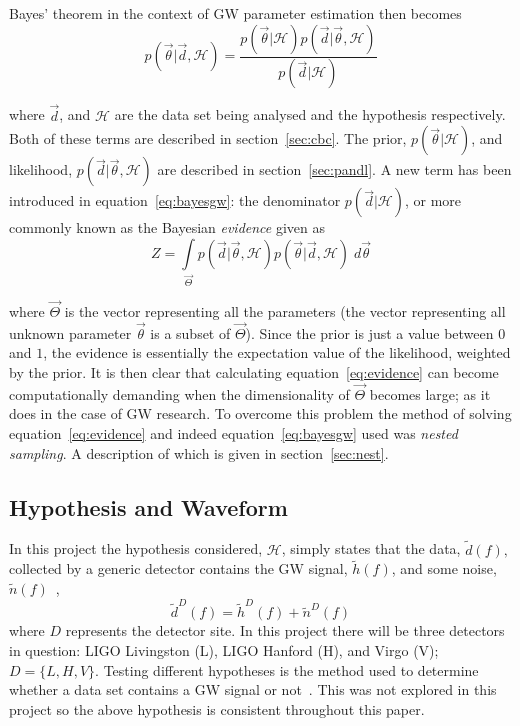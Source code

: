 \documentclass{jpconf}
\newcommand{\curlH}{\mathcal{H}}
\newcommand{\gws}{\tilde{h}}
\begin{document}
Bayes' theorem in the context of GW parameter estimation then becomes
\begin{equation}
\label{eq:bayesgw}
  p(\vec{\theta} | \vec{d}, \curlH) = \frac{p(\vec{\theta} | \curlH) p(\vec{d} | \vec{\theta}, \curlH)}{p(\vec{d} | \curlH)}
\end{equation}

where $\vec{d}$, and $\curlH$ are the data set being analysed and the hypothesis respectively. Both of these terms are described in section~\ref{sec:cbc}. The prior, $p(\vec{\theta}| \curlH)$, and likelihood, $p(\vec{d} | \vec{\theta}, \curlH)$ are described in section~\ref{sec:pandl}. A new term has been introduced in equation~\ref{eq:bayesgw}: the denominator $p(\vec{d}|\curlH)$, or more commonly known as the Bayesian \textit{evidence} given as
\begin{equation}
  \label{eq:evidence}
   Z = \int \limits_{\vec{\Theta}} p(\vec{d}|\vec{\theta}, \mathcal{H}) p(\vec{\theta} | \vec{d}, \mathcal{H})  \;d\vec{\theta} 
\end{equation}

where $\vec{\Theta}$ is the vector representing all the parameters (the vector representing all unknown parameter $\vec{\theta}$ is a subset of $\vec{\Theta}$). Since the prior is just a value between $0$ and $1$, the evidence is essentially the expectation value of the likelihood, weighted by the prior. It is then clear that calculating equation~\ref{eq:evidence} can become computationally demanding when the dimensionality of $\vec{\Theta}$ becomes large; as it does in the case of GW research. To overcome this problem the method of solving equation~\ref{eq:evidence} and indeed equation~\ref{eq:bayesgw} used was \textit{nested sampling}. A description of which is given in section~\ref{sec:nest}.


\subsection{Hypothesis and Waveform\label{sec:cbc}}

In this project the hypothesis considered, $\curlH$, simply states that the data, $\tilde{d}(f),$ collected by a generic detector contains the GW signal, $\gws(f)$, and some noise, $\tilde{n}(f)$~\cite{JVei},
\begin{equation}
  \label{eq:data}
  \tilde{d}^D(f) = \gws^D(f) + \tilde{n}^D(f)
\end{equation}
where $D$ represents the detector site. In this project there will be three detectors in question: LIGO Livingston (L), LIGO Hanford (H), and Virgo (V); $D = \{L,H,V\}$. Testing different hypotheses is the method used to determine whether a data set contains a GW signal or not~\cite{SathSchutz}. This was not explored in this project so the above hypothesis is consistent throughout this paper.
\end{document}
